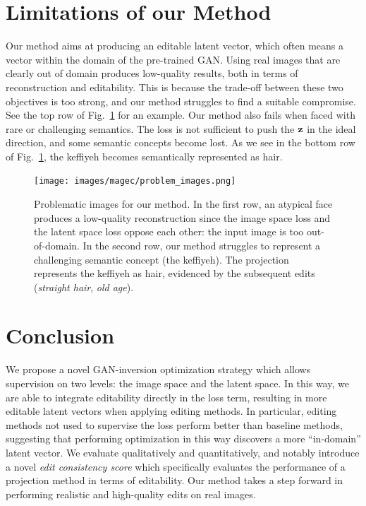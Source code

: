 \section{Limitations of our Method}\label{section:magec_limitations}




Our method aims at producing an editable latent vector, which often means a 
vector within the domain of the pre-trained GAN. Using real images that are 
clearly out of domain produces low-quality results, both in terms of 
reconstruction and editability. This is because the trade-off between these
 two objectives is too strong, and our method struggles to find a suitable
  compromise. See the top row of Fig.~\ref{fig:problem_images} for an example.
  Our method also fails when faced with rare or challenging semantics. 
The \magec loss is not sufficient to push the $\mathbf{z}$ in the ideal direction, 
and some semantic concepts  become lost. As we see in the bottom row of 
Fig.~\ref{fig:problem_images}, the keffiyeh becomes semantically represented 
as hair.

\begin{figure}
\centering

    \texttt{[image: images/magec/problem\_images.png]}

\caption{Problematic images for our method. In the first row, an atypical face 
produces a low-quality reconstruction since the image space loss and the latent 
space loss oppose each other: the input image is too out-of-domain. In the
 second row, our method struggles to represent a challenging semantic concept 
 (the keffiyeh). The projection represents the keffiyeh as hair, 
 evidenced by the subsequent edits (\emph{straight hair}, \emph{old age}).}
    \label{fig:problem_images}
\end{figure}



\section{Conclusion}

We propose a novel GAN-inversion optimization strategy which 
allows supervision on two levels: the image space and the latent
 space. In this way, we are able to integrate editability directly
  in the loss term, resulting in more editable latent vectors when
   applying editing methods. In particular, editing methods not 
   used to supervise the loss perform better than baseline methods,
    suggesting that performing optimization in this way discovers 
    a more ``in-domain'' latent vector. We evaluate qualitatively 
    and quantitatively, and notably introduce a novel 
    \emph{edit consistency score} which specifically evaluates the
     performance of a projection method in terms of editability.
      Our method takes a step forward in performing realistic and 
      high-quality edits on real images.


